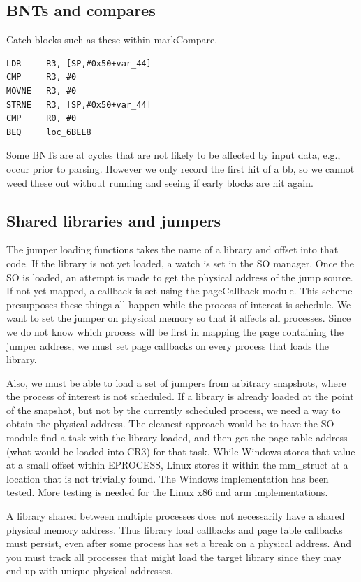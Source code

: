 \documentclass[titlepage]{article}
\begin{document}
\begin{appendices}
\subsection{BNTs and compares}
Catch blocks such as these within markCompare.
\begin{verbatim}
LDR     R3, [SP,#0x50+var_44]
CMP     R3, #0
MOVNE   R3, #0
STRNE   R3, [SP,#0x50+var_44]
CMP     R0, #0
BEQ     loc_6BEE8
\end{verbatim}
Some BNTs are at cycles that are not likely to be affected by input data, e.g., occur prior to parsing.  However we only record the first hit of a bb, so we cannot weed these out without
running and seeing if early blocks are hit again.

\subsection{Shared libraries and jumpers}
The jumper loading functions takes the name of a library and offset into that code.  If the library is not yet loaded, a watch is set in the SO manager.
Once the SO is loaded, an attempt is made to get the physical address of the jump source.  If not yet mapped, a callback is set using the pageCallback module.
This scheme presupposes these things all happen while the process of interest is schedule.   We want to set the jumper on physical memory so that it affects
all processes.  Since we do not know which process will be first in mapping the page containing the jumper address, we must set page callbacks on every process
that loads the library. 

Also, we must be able to load a set of jumpers from arbitrary snapshots, where the process of interest is not scheduled.  If a library is already
loaded at the point of the snapshot, but not by the currently scheduled process, we need a way to obtain the physical address.  The cleanest approach would
be to have the SO module find a task with the library loaded, and then get the page table address (what would be loaded into CR3) for that task.  While 
Windows stores that value at a small offset within EPROCESS, Linux stores it within the mm\_struct at a location that is not trivially found.  The Windows
implementation has been tested.  More testing is needed for the Linux x86 and arm implementations.

A library shared between multiple processes does not necessarily have a shared physical memory address.  Thus library load callbacks and page table callbacks
must persist, even after some process has set a break on a physical address.  And you must track all processes that might load the target library since they may
end up with unique physical addresses.


\end{appendices}
\end{document}
